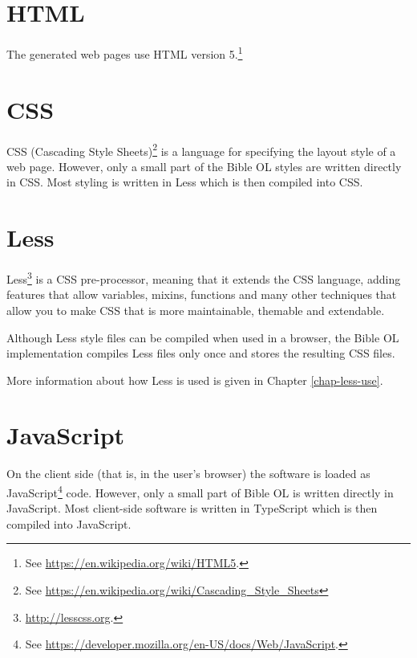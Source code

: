 \documentclass[11pt,oneside,a4paper]{memoir}
\begin{document}
\section{HTML}

The generated web pages use HTML version 5.\footnote{See \url{https://en.wikipedia.org/wiki/HTML5}.}


\section{CSS}\label{sec-css}

CSS (Cascading Style Sheets)\footnote{See
  \url{https://en.wikipedia.org/wiki/Cascading_Style_Sheets}} is a language for specifying the
layout style of a web page. However, only a small part of the Bible OL styles are written directly
in CSS. Most styling is written in Less which is then compiled into CSS.


\section{Less}\label{sec-less}

Less\footnote{\url{http://lesscss.org}.} is a CSS pre-processor, meaning that it
extends the CSS language, adding features that allow variables, mixins, functions and many other
techniques that allow you to make CSS that is more maintainable, themable and extendable.

Although Less style files can be compiled when used in a browser, the Bible OL implementation
compiles Less files only once and stores the resulting CSS files.

More information about how Less is used is given in Chapter \ref{chap-less-use}.

\section{JavaScript}

On the client side (that is, in the user's browser) the software is loaded as
JavaScript\footnote{See \url{https://developer.mozilla.org/en-US/docs/Web/JavaScript}.} code.
However, only a small part of Bible OL is written directly in JavaScript. Most client-side software
is written in TypeScript which is then compiled into JavaScript.
\end{document}
